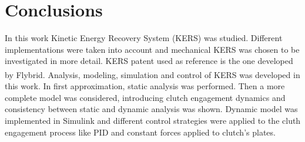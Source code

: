 \documentclass[11pt]{article}
\begin{document}
\section{Conclusions}

In this work Kinetic Energy Recovery System (KERS) was studied. Different implementations were taken into account and mechanical KERS was chosen to be investigated in more detail. KERS patent used as reference is the one developed by Flybrid\textsuperscript\textregistered. Analysis, modeling, simulation and control of KERS was developed in this work. In first approximation, static analysis was performed. Then a more complete model was considered, introducing clutch engagement dynamics and consistency between static and dynamic analysis was shown. Dynamic model was implemented in Simulink and different control strategies were applied to the cluth engagement process like PID and constant forces applied to clutch's plates.

\newpage
\end{document}
